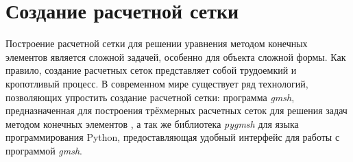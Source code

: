 \section{Создание расчетной сетки}

Построение расчетной сетки для решении уравнения методом конечных элементов является сложной задачей, особенно для объекта сложной 
формы. Как правило, создание расчетных сеток представляет собой трудоемкий и кропотливый процесс. В современном мире 
существует ряд технологий, позволяющих упростить создание расчетной сетки: программа \textit{gmsh}, предназначенная для 
построения трёхмерных расчетных сеток для решения задач методом конечных элементов \cite{gmsh_man}, а так же библиотека 
\textit{pygmsh} для языка программирования Python, предоставляющая удобный интерфейс для работы с программой \textit{gmsh}.

